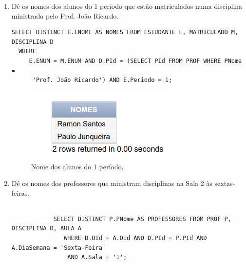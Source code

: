 \documentclass[
article,			%
11pt,				%
oneside,			%
a4paper,			%
english,			%
brazil,				%
sumario=tradicional
]{abntex2}
\begin{document}
	
	\frenchspacing 
	
	
	\maketitle
	\begin{enumerate}
		\item Dê os nomes dos alunos do 1 período que estão matriculados numa disciplina ministrada pelo
		Prof. João Ricardo.
				\begin{verbatim}
SELECT DISTINCT E.ENOME AS NOMES FROM ESTUDANTE E, MATRICULADO M, DISCIPLINA D 
  WHERE
     E.ENUM = M.ENUM AND D.PId = (SELECT PId FROM PROF WHERE PNome =
      'Prof. João Ricardo') AND E.Periodo = 1;
				\end{verbatim}
				
				\begin{center}
					\begin{figure}[H]
						\centering
						\includegraphics[scale=0.5]{./imagens/at-01.png}
						\caption{Nome dos alunos do 1 período.}
						\label{rota-1}
					\end{figure}
				\end{center}
			
						\item Dê os nomes dos professores que ministram disciplinas na Sala 2 às sextas-feiras.
						\begin{verbatim}

			SELECT DISTINCT P.PNome	AS PROFESSORES FROM PROF P, DISCIPLINA D, AULA A
			   WHERE D.DId = A.DId AND D.PId = P.PId AND A.DiaSemana = 'Sexta-Feira'
			    AND A.Sala = '1';
						\end{verbatim}
						

\end{enumerate}
\end{document}
